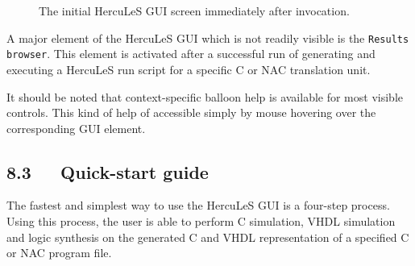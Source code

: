 \documentclass[a4paper]{article}
\begin{document}
\begin{figure}
\label{hercules-gui-basicscreen}
\noindent{}
\caption{The initial HercuLeS GUI screen immediately after invocation.}
\end{figure}

A major element of the HercuLeS GUI which is not readily visible is the \texttt{Results browser}. This element is activated after a successful run of generating and executing a HercuLeS run script for a specific C or NAC translation unit.

It should be noted that context-specific balloon help is available for most visible controls. This kind of help of accessible simply by mouse hovering over the corresponding GUI element.


\subsection{8.3~~~Quick-start guide%
  \label{quick-start-guide}%
}

The fastest and simplest way to use the HercuLeS GUI is a four-step process. Using this process, the user is able to perform C simulation, VHDL simulation and logic synthesis on the generated C and VHDL representation of a specified C or NAC program file.
\end{document}
